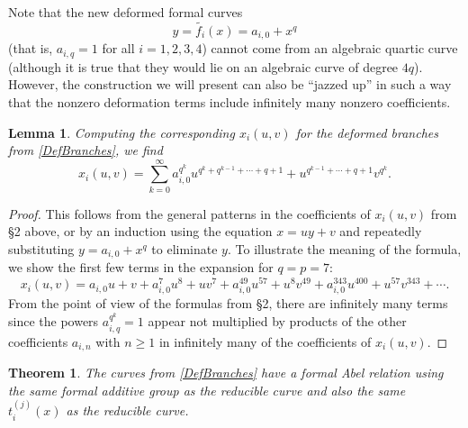 \documentclass[12pt]{amsart}
\theoremstyle{theorem}
\newtheorem{thm}{Theorem}
\newtheorem{lem}{Lemma}
\begin{document}
Note that the new deformed formal curves
\begin{equation}
\label{DefBranches}
y = \widetilde{f_i}(x) = a_{i,0} + x^q
\end{equation}
(that is, $a_{i,q} = 1$ for all $i = 1,2,3,4$)
cannot come from an algebraic quartic curve (although it is true that they would lie on an algebraic curve of degree $4q$).
However, the construction we will present can also be ``jazzed up'' in such a way that the nonzero deformation
terms include infinitely many nonzero coefficients.

\begin{lem}  Computing the corresponding $x_i(u,v)$ for the deformed branches from \eqref{DefBranches}, 
we find
$$x_i(u,v) = \sum_{k=0}^\infty a_{i,0}^{q^k} u^{q^k+q^{k-1}+\cdots+q+1} + u^{q^{k-1} + \cdots + q+1} v^{q^k}.$$
\end{lem}

\begin{proof}  This follows from the general patterns in the coefficients of $x_i(u,v)$ from \S 2 above, or by an induction 
using the equation $x = u y + v$ and repeatedly substituting $y = a_{i,0} + x^q$ to eliminate $y$.  
 To illustrate the 
meaning of the formula, we show the first few terms in the expansion for $q = p = 7$:
$$x_i(u,v) = a_{i,0} u + v + a_{i,0}^7 u^8 + u v^7 + a_{i,0}^{49} u^{57} + u^8 v^{49} + a_{i,0}^{343} u^{400} + u^{57} v^{343} + \cdots .$$
From the point of view of the formulas from \S 2, there are infinitely many terms since the powers $a_{i,q}^{q^k} = 1$ appear 
not multiplied by products of the other
coefficients $a_{i,n}$ with $n \ge 1$ in infinitely many of the coefficients of $x_i(u,v)$.
\end{proof}

\begin{thm} 
The curves from \eqref{DefBranches} have a formal Abel relation using the same formal additive group
as the reducible curve and also the same $t_i^{(j)}(x)$ as the reducible curve.  
\end{thm}
\end{document}
